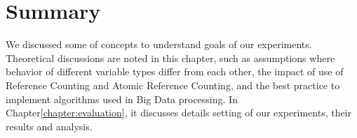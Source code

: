 \section{Summary}
\label{sec:concept_summary}
We discussed some of concepts to understand goals of our experiments. 
Theoretical discussions are noted in this chapter, such as assumptions where behavior of different variable types differ from each other, the impact of use of Reference Counting and Atomic Reference Counting, 
and the best practice to implement algorithms used in Big Data processing. In Chapter\ref{chapter:evaluation}, it discusses details setting of our experiments, their results and analysis.


\clearpage
